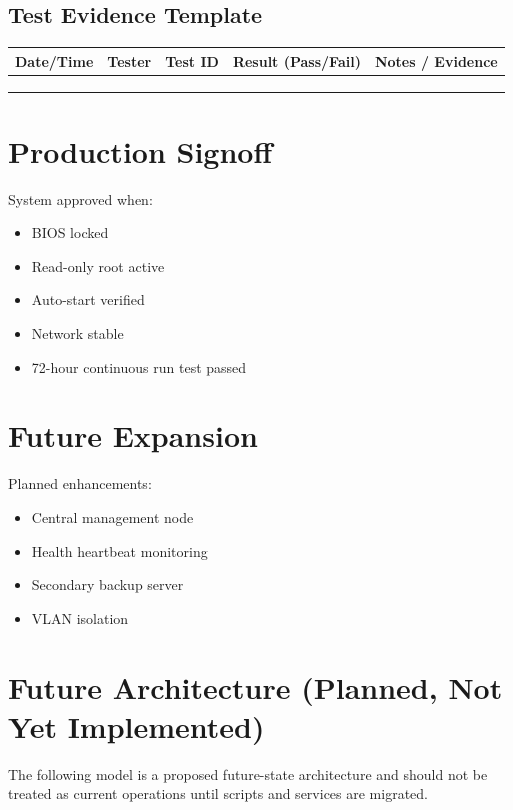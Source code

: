 \documentclass[11pt,letterpaper]{article}
\begin{document}
\subsection{Test Evidence Template}

\begin{longtable}{p{1.1in} p{1.0in} p{0.7in} p{1.3in} p{1.7in}}
Date/Time & Tester & Test ID & Result (Pass/Fail) & Notes / Evidence \\
\hline
 &  &  &  &  \\
 &  &  &  &  \\
 &  &  &  &  \\
\end{longtable}


\section{Production Signoff}

System approved when:

\begin{itemize}
\item BIOS locked
\item Read-only root active
\item Auto-start verified
\item Network stable
\item 72-hour continuous run test passed
\end{itemize}

\section{Future Expansion}

Planned enhancements:

\begin{itemize}
\item Central management node
\item Health heartbeat monitoring
\item Secondary backup server
\item VLAN isolation
\end{itemize}

\section{Future Architecture (Planned, Not Yet Implemented)}

The following model is a proposed future-state architecture and should not be treated as current operations until scripts and services are migrated.
\end{document}
